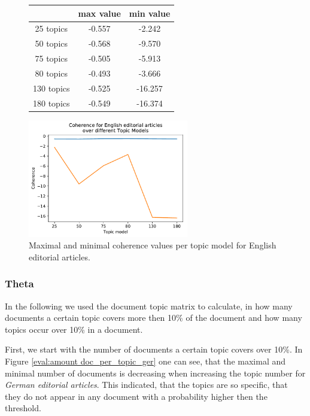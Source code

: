 \begin{figure}[h]
	\begin{minipage}[t]{0.5\textwidth}
		\centering
		\begin{tabular}{c|cc}
			&max value & min value\\
			\hline
			25 topics&-0.557&-2.242\\
			50 topics&-0.568&-9.570\\
			75 topics&-0.505&-5.913\\
			80 topics&	-0.493&-3.666\\
			130 topics &-0.525&-16.257\\
			180 topics&	-0.549&-16.374\\
		\end{tabular}
	\end{minipage}%
	\begin{minipage}{0.5\textwidth}
		\centering
		\includegraphics[width=7cm]{gfx/Eval_IC/English_Editorial_Coherence.pdf}
	\end{minipage}
	\caption[]{Maximal and minimal coherence values per topic model for English editorial articles.}
	\label{eval:coherence_en}
\end{figure}

\subsubsection{Theta}

In the following we used the document topic matrix to calculate, in how many documents a certain topic covers more then 10\% of the document and how many topics occur over 10\% in a document. 

First, we start with the number of documents a certain topic covers over 10\%.
In Figure \ref{eval:amount doc_per_topic_ger} one can see, that the maximal and minimal number of documents is decreasing when increasing the topic number for \textit{German editorial articles}. This indicated, that the topics are so specific, that they do not appear in any document with a probability higher then the threshold.

